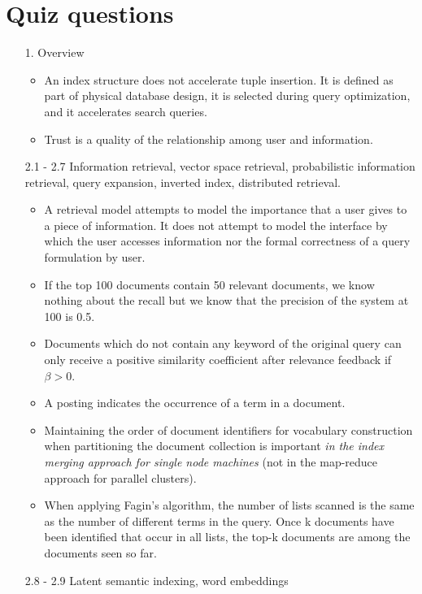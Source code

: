 \section*{Quiz questions} %
\label{sub:quiz_questions}
  \begin{enumerate}
    \item[1. ] Overview
    \begin{itemize}
      \item  An index structure does not accelerate tuple insertion. It is defined as part of physical database design, it is selected during query optimization, and it accelerates search queries.
      \item Trust is a quality of the relationship among user and information.
    \end{itemize}
    \item[2.1 - 2.7] Information retrieval, vector space retrieval, probabilistic information retrieval, query expansion, inverted index, distributed retrieval.
    \begin{itemize}
      \item  A retrieval model attempts to model the importance that a user gives to a piece of information. It does not attempt to model the interface by which the user accesses information nor the formal correctness of a query formulation by user.
      \item If the top 100 documents contain 50 relevant documents, we know nothing about the recall but we know that the precision of the system at 100 is 0.5.
      \item Documents which do not contain any keyword of the original query can only receive a positive similarity coefficient after relevance feedback if $\beta >0$.
      \item A posting indicates  the occurrence of a term in a document.
      \item Maintaining the order of document identifiers for vocabulary construction when partitioning the document collection is important \emph{in the index merging approach for single node machines} (not in the map-reduce approach for parallel clusters).
      \item When applying Fagin's algorithm, the number of lists scanned is the same as the number of different terms in the query. Once k documents have been identified that occur in all lists, the top-k documents are among the documents seen so far.
    \end{itemize}
    \item[2.8 - 2.9] Latent semantic indexing, word embeddings

\end{enumerate}
